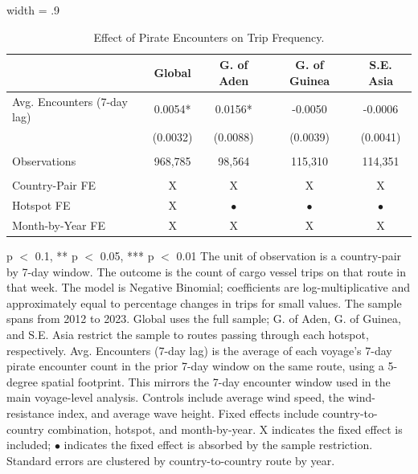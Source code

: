 \begin{table}
\centering
\caption{Effect of Pirate Encounters on Trip Frequency. \label{tab:trip-count}}
\centering
\begin{adjustbox}{width = .9\textwidth}
\begin{threeparttable}
\begin{tabular}[t]{lcccc}
\toprule
  & Global & G. of Aden & G. of Guinea & S.E. Asia\\
\midrule
Avg. Encounters (7-day lag) & 0.0054* & 0.0156* & -0.0050 & -0.0006\\
 & (0.0032) & (0.0088) & (0.0039) & (0.0041)\\
 &  &  &  & \\
Observations & 968,785 & 98,564 & 115,310 & 114,351\\
 &  &  &  & \\
Country-Pair FE & X & X & X & X\\
Hotspot FE & X & $\bullet$ & $\bullet$ & $\bullet$\\
Month-by-Year FE & X & X & X & X\\
\bottomrule
\end{tabular}
\begin{tablenotes}
\item \scriptsize * p $<$ 0.1, ** p $<$ 0.05, *** p $<$ 0.01 The unit of observation is a country-pair by 7-day window. The outcome is the count of cargo vessel trips on that route in that week. The model is Negative Binomial; coefficients are log-multiplicative and approximately equal to percentage changes in trips for small values. The sample spans from 2012 to 2023. Global uses the full sample; G. of Aden, G. of Guinea, and S.E. Asia restrict the sample to routes passing through each hotspot, respectively. Avg. Encounters (7-day lag) is the average of each voyage's 7-day pirate encounter count in the prior 7-day window on the same route, using a 5-degree spatial footprint. This mirrors the 7-day encounter window used in the main voyage-level analysis. Controls include average wind speed, the wind-resistance index, and average wave height. Fixed effects include country-to-country combination, hotspot, and month-by-year. X indicates the fixed effect is included; $\bullet$ indicates the fixed effect is absorbed by the sample restriction. Standard errors are clustered by country-to-country route by year.
\end{tablenotes}
\end{threeparttable}
\end{adjustbox}
\end{table}
